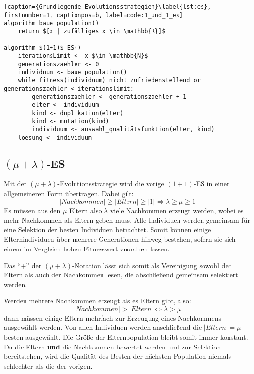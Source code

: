 \begin{lstlisting}[caption={Grundlegende Evolutionsstrategien}\label{lst:es}, firstnumber=1, captionpos=b, label=code:1_und_1_es]
algorithm baue_population()
	return $[x | zufälliges x \in \mathbb{R}]$

algorithm $(1+1)$-ES()
	iterationsLimit <- x $\in \mathbb{N}$
	generationszaehler <- 0
	individuum <- baue_population()
	while fitness(individuum) nicht zufriedenstellend or generationszaehler < iterationslimit:
		generationszaehler <- generationszaehler + 1
		elter <- individuum
		kind <- duplikation(elter)
		kind <- mutation(kind)
		individuum <- auswahl_qualitätsfunktion(elter, kind)
	loesung <- individuum
\end{lstlisting}

\subsection{$(\mu + \lambda)$-ES}

Mit der $(\mu + \lambda)$-Evolutionsstrategie wird die vorige $(1+1)$-ES in einer allgemeineren Form übertragen.
Dabei gilt:
\begin{equation}
|Nachkommen| \ge |Eltern| \ge |1| \Leftrightarrow \lambda \ge \mu \ge 1
\end{equation}
Es müssen aus den $\mu$ Eltern also $\lambda$ viele Nachkommen erzeugt werden, wobei es mehr Nachkommen als Eltern geben muss.
Alle Individuen werden gemeinsam für eine Selektion der besten Individuen betrachtet.
Somit können einige Elternindividuen über mehrere Generationen hinweg bestehen, sofern sie sich einem im Vergleich hohen Fitnesswert zuordnen lassen.

Das \enquote{+} der $(\mu + \lambda)$-Notation lässt sich somit als Vereinigung sowohl der Eltern als auch der Nachkommen lesen, die abschließend gemeinsam selektiert werden.

Werden mehrere Nachkommen erzeugt als es Eltern gibt, also:
\begin{equation}
|Nachkommen| > |Eltern| \Leftrightarrow \lambda > \mu
\end{equation}
dann müssen einige Eltern mehrfach zur Erzeugung eines Nachkommens ausgewählt werden.
Von allen Individuen werden anschließend die $|Eltern| = \mu$ besten ausgewählt. Die Größe der Elternpopulation bleibt somit immer konstant. Da die Eltern \textbf{und} die Nachkommen bewertet werden und zur Selektion bereitstehen, wird die Qualität des Besten der nächsten Population niemals schlechter als die der vorigen.

